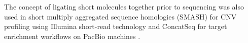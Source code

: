 The concept of ligating short molecules together prior to sequencing was
also used in short multiply aggregated sequence homologies (SMASH) for
CNV profiling using Illumina short-read technology \citep{wang2016smash}
and ConcatSeq for target enrichment workflows on PacBio machines
\citep{schlecht2017concatseq}.
